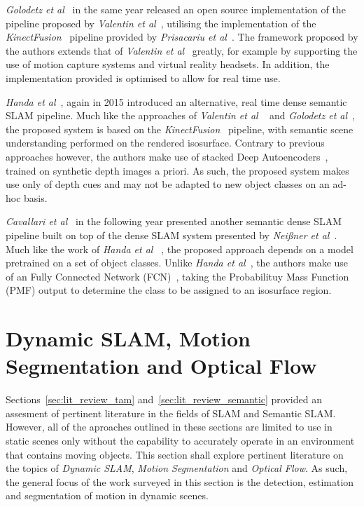 \textit{Golodetz et al}~\cite{Golodetz2015} in the same year released an open source 
implementation of the pipeline proposed by \textit{Valentin et al}~\cite{Valentin2015}, 
utilising the implementation of the \textit{KinectFusion}~\cite{Newcombe2011} pipeline 
provided by \textit{Prisacariu et al}~\cite{Prisacariu2014}. The framework proposed by 
the authors extends that of \textit{Valentin et al}~\cite{Valentin2015} greatly, for 
example by supporting the use of motion capture systems and virtual reality headsets. 
In addition, the implementation provided is optimised to allow for real time use.

\textit{Handa et al}~\cite{Handa2015}, again in 2015 introduced an alternative, 
real time dense semantic SLAM pipeline. Much like the approaches of \textit{Valentin et al} 
~\cite{Valentin2015} and \textit{Golodetz et al}~\cite{Golodetz2015}, the proposed system 
is based on the \textit{KinectFusion}~\cite{Newcombe2011} pipeline, with semantic scene 
understanding performed on the rendered isosurface. Contrary to previous approaches however, 
the authors make use of stacked Deep Autoencoders~\cite{Liou2008}, trained on synthetic depth 
images a priori. As such, the proposed system makes use only of depth cues and may not be 
adapted to new object classes on an ad-hoc basis.

\textit{Cavallari et al}~\cite{Cavallari2016} in the following year presented another 
semantic dense SLAM pipeline built on top of the dense SLAM system presented by 
\textit{Nei{\ss}ner et al}~\cite{NieBner2013}. Much like the work of \textit{Handa et al} 
~\cite{Handa2015}, the proposed approach depends on a model pretrained on a set of object 
classes. Unlike \textit{Handa et al}~\cite{Handa2015}, the authors make use of an 
Fully Connected Network (FCN)~\cite{Long2015}, taking the Probabilituy Mass Function (PMF) 
output to determine the class to be assigned to an isosurface region.

\section{Dynamic SLAM, Motion Segmentation and Optical Flow}
\label{sec:lit_review_dynamic}
Sections~\ref{sec:lit_review_tam} and~\ref{sec:lit_review_semantic} provided an assesment 
of pertinent literature in the fields of SLAM and Semantic SLAM. However, all of the 
aproaches outlined in these sections are limited to use in static scenes only without 
the capability to accurately operate in an environment that contains moving objects. This 
section shall explore pertinent literature on the topics of \textit{Dynamic SLAM}, 
\textit{Motion Segmentation} and \textit{Optical Flow}. As such, the general focus of the 
work surveyed in this section is the detection, estimation and segmentation of motion in 
dynamic scenes.

